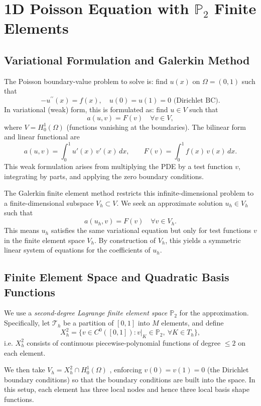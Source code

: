 \documentclass[a4paper,10pt]{article}
\begin{document}
\section[Quadratic FEM for Poisson]{1D Poisson Equation with \texorpdfstring{$\mathbb{P}_2$}{P2} Finite Elements}
\subsection{Variational Formulation and Galerkin Method}
The Poisson boundary-value problem to solve is: find \(u(x)\) on \(\Omega=(0,1)\) such that
\[
-u^{\prime\prime}(x) = f(x), \quad u(0)=u(1)=0 \text{ (Dirichlet BC)}.
\]
In variational (weak) form, this is formulated as: find \(u \in V\) such that
\[
a(u,v) = F(v) \quad \forall v \in V,
\]
where \(V = H^1_0(\Omega)\) (functions vanishing at the boundaries).
The bilinear form and linear functional are
\[
a(u,v) = \int_0^1 u'(x)\,v'(x)\,dx, \qquad F(v) = \int_0^1 f(x)\,v(x)\,dx.
\]
This weak formulation arises from multiplying the PDE by a test function \(v\), integrating by parts, and applying the zero boundary conditions.

The Galerkin finite element method restricts this infinite-dimensional problem to a finite-dimensional subspace \(V_h \subset V\). 
We seek an approximate solution \(u_h \in V_h\) such that
\[
a(u_h, v) = F(v) \quad \forall v \in V_h.
\]
This means \(u_h\) satisfies the same variational equation but only for test functions \(v\) in the finite element space \(V_h\). By construction of \(V_h\), this yields a symmetric linear system of equations for the coefficients of \(u_h\).

\subsection{Finite Element Space and Quadratic Basis Functions}
We use a \emph{second-degree Lagrange finite element space \(\mathbb{P}_2\)} for the approximation.
Specifically, let \(\mathcal{T}_h\) be a partition of \([0,1]\) into \(M\) elements, and define
\[
	X_h^2 = \{ v \in C^0([0,1]) : v|_{K} \in \mathbb{P}_2,\ \forall K \in T_h\},
\]
i.e. \(X_h^2\) consists of continuous piecewise-polynomial functions of degree \(\le 2\) on each element.

We then take \(V_h = X_h^2 \cap H^1_0(\Omega)\) , enforcing \(v(0)=v(1)=0\) (the Dirichlet boundary conditions) so that the boundary conditions are built into the space.
In this setup, each element has three local nodes and hence three local basis shape functions.
\end{document}
